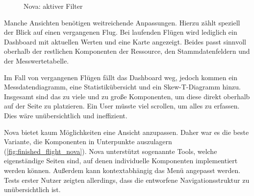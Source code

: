 \begin{figure}[h!]
    \centering
    \caption{Nova: aktiver Filter}
    \label{fig:active_filter_nova}
\end{figure}
\color{black}

\newpage

Manche Ansichten benötigen weitreichende Anpassungen.
Hierzu zählt speziell der Blick auf einen vergangenen Flug.
Bei laufenden Flügen wird lediglich ein Dashboard mit aktuellen Werten und eine Karte angezeigt.
Beides passt sinnvoll oberhalb der restlichen Komponenten der Ressource, den Stammdatenfeldern und der Messwertetabelle.

Im Fall von vergangenen Flügen fällt das Dashboard weg, jedoch kommen ein Messdatendiagramm, eine Statistikübersicht und ein Skew-T-Diagramm hinzu.
Insgesamt sind das zu viele und zu große Komponenten, um diese direkt oberhalb auf der Seite zu platzieren.
Ein User müsste viel scrollen, um alles zu erfassen.
Dies wäre unübersichtlich und ineffizient.

Nova bietet kaum Möglichkeiten eine Ansicht anzupassen.
Daher war es die beste Variante, die Komponenten in Unterpunkte auszulagern (\ref{fig:finished_flight_nova}).
Nova unterstützt sogenannte Tools, welche eigenständige Seiten sind, auf denen individuelle Komponenten implementiert werden können.
Außerdem kann kontextabhängig das Menü angepasst werden.
Tests erster Nutzer zeigten allerdings, dass die entworfene Navigationsstruktur zu unübersichtlich ist.

\newpage

